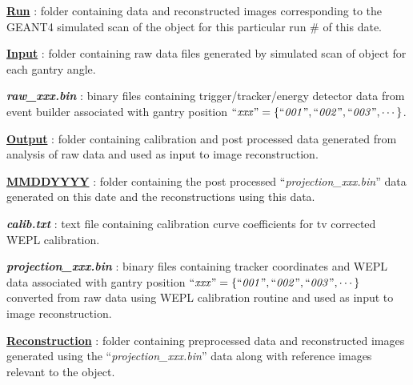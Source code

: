 \documentclass{article}
\begin{document}
\begin{myEnumerate}[labelindent=0pt, leftmargin=*]
\begin{myEnumerate}[labelindent=1pt, leftmargin=*]
\begin{myEnumerate}[labelindent=1pt, leftmargin=*]
            \begin{myEnumerate}[labelindent=1pt, leftmargin=*]
                \item \ul{\textbf{Run}} : folder containing data and reconstructed images corresponding to the GEANT4 simulated scan of the object for this particular run \# of this date.
                \begin{myEnumerate}[labelindent=1pt, leftmargin=*]
                    \item \ul{\textbf{Input}} : folder containing raw data files generated by simulated scan of object for each gantry angle.
                    \begin{myEnumerate}[labelindent=1pt, leftmargin=*]
                        \item \textbf{\textit{raw\_xxx.bin}} : binary files containing trigger/tracker/energy detector data from event builder associated with gantry position $\textrm{``\textit{xxx}''} =\{\textrm{``\textit{001}''}, \textrm{``\textit{002}''}, \textrm{``\textit{003}''}, \cdots\}$.
                    \end{myEnumerate}
                    \item \ul{\textbf{Output}} : folder containing calibration and post processed data generated from analysis of raw data and used as input to image reconstruction.
                    \begin{myEnumerate}[labelindent=1pt, leftmargin=*]
                        \item \ul{\textbf{MMDDYYYY}} : folder containing the post processed ``\textit{projection\_xxx.bin}'' data generated on this date and the reconstructions using this data.
                        \begin{myEnumerate}[labelindent=1pt, leftmargin=*]
                            \item \textbf{\textit{calib.txt}} : text file containing calibration curve coefficients for tv corrected WEPL calibration.
                            \item \textbf{\textit{projection\_xxx.bin}} : binary files containing tracker coordinates and WEPL data associated with gantry position $\textrm{``\textit{xxx}''} =\{\textrm{``\textit{001}''}, \textrm{``\textit{002}''}, \textrm{``\textit{003}''}, \cdots\}$ converted from raw data using WEPL calibration routine and used as input to image reconstruction.
                            \item \ul{\textbf{Reconstruction}} : folder containing preprocessed data and reconstructed images generated using the ``\textit{projection\_xxx.bin}'' data along with reference images relevant to the object.

\end{myEnumerate}
\end{myEnumerate}
\end{myEnumerate}
\end{myEnumerate}
\end{myEnumerate}
\end{myEnumerate}
\end{myEnumerate}
\end{document}
